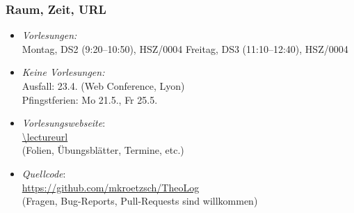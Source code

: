 \documentclass[aspectratio=1610,onlymath]{beamer}
\begin{document}
\maketitle



%
%

\begin{frame}\frametitle{Raum, Zeit, URL}

\begin{itemize}
\item \emph{Vorlesungen:}\\
	Montag, DS2 (9:20--10:50), HSZ/0004
	Freitag, DS3 (11:10--12:40), HSZ/0004\\
\item \emph{Keine Vorlesungen:}\\
	Ausfall: 23.4. (Web Conference, Lyon)\\
	Pfingstferien: Mo 21.5., Fr 25.5.
\item \emph{Vorlesungswebseite}:\\[1ex]
	\url{\lectureurl}\\[1ex]
	(Folien, Übungsblätter, Termine, etc.)
\item \emph{Quellcode}:\\[1ex]
	\url{https://github.com/mkroetzsch/TheoLog}\\[1ex]
	(Fragen, Bug-Reports, Pull-Requests sind willkommen)
\end{itemize}

\end{frame}
\end{document}
